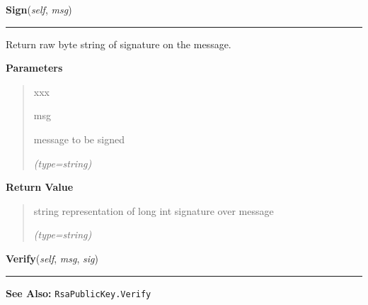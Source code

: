 \hspace{.8\funcindent}\begin{boxedminipage}{\funcwidth}

    \raggedright \textbf{Sign}(\textit{self}, \textit{msg})

    \vspace{-1.5ex}

    \rule{\textwidth}{0.5\fboxrule}
\setlength{\parskip}{2ex}
    Return raw byte string of signature on the message.

\setlength{\parskip}{1ex}
      \textbf{Parameters}
      \vspace{-1ex}

      \begin{quote}
        \begin{Ventry}{xxx}

          \item[msg]

          message to be signed

            {\it (type=string)}

        \end{Ventry}

      \end{quote}

      \textbf{Return Value}
    \vspace{-1ex}

      \begin{quote}
      string representation of long int signature over message

      {\it (type=string)}

      \end{quote}

    \end{boxedminipage}

    \label{keyczar:keys:RsaPrivateKey:Verify}

    \vspace{0.5ex}

\hspace{.8\funcindent}\begin{boxedminipage}{\funcwidth}

    \raggedright \textbf{Verify}(\textit{self}, \textit{msg}, \textit{sig})

    \vspace{-1.5ex}

    \rule{\textwidth}{0.5\fboxrule}
\setlength{\parskip}{2ex}
\setlength{\parskip}{1ex}
\textbf{See Also:} \texttt{RsaPublicKey.Verify}



    \end{boxedminipage}


